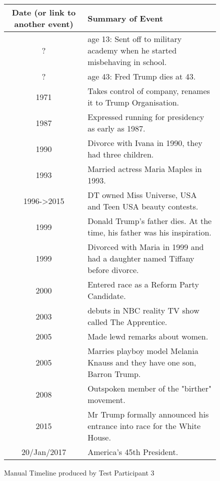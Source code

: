 \begin{figure}[H]
\begin{tabular}{|c|p{8.5cm}|}
\hline
Date (or link to another event) & Summary of Event\\
\hline
\hline
? & age 13: Sent off to military academy when he started misbehaving in school.\\
\hline
? & age 43: Fred Trump dies at 43.\\
\hline
1971 & Takes control of company, renames it to Trump Organisation.\\
\hline
1987 & Expressed running for presidency as early as 1987.\\
\hline
1990 & Divorce with Ivana in 1990, they had three children.\\
\hline
1993 & Married actress Maria Maples in 1993.\\
\hline
1996->2015 & DT owned Miss Universe, USA and Teen USA beauty contests.\\
\hline
1999 & Donald Trump's father dies. At the time, his father was his inspiration.\\
\hline
1999 & Divorced with Maria in 1999 and had a daughter named Tiffany before divorce.\\
\hline
2000 & Entered race as a Reform Party Candidate.\\
\hline
2003 & debuts in NBC reality TV show called The Apprentice.\\
\hline
2005 & Made lewd remarks about women.\\
\hline
2005 & Marries playboy model Melania Knauss and they have one son, Barron Trump.\\
\hline
2008 & Outspoken member of the "birther" movement.\\
\hline
2015 & Mr Trump formally announced his entrance into race for the White House.\\
\hline
20/Jan/2017 & America's 45th President.\\
\hline
\end{tabular}
\caption{Manual Timeline produced by Test Participant 3}
\end{figure}

